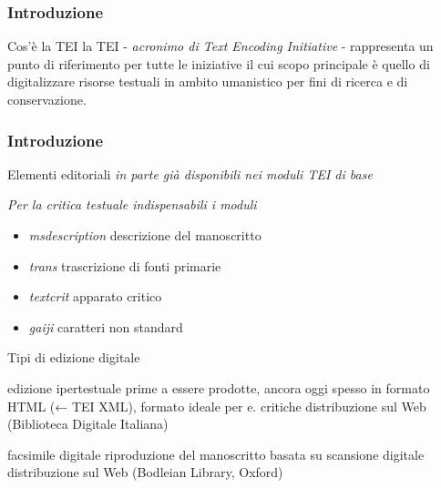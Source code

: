\begin{frame}
    \frametitle{Introduzione}
    \addtocounter{nframe}{1}
    

    \begin{block}{Cos'è la TEI}
        la TEI - \textit{acronimo di Text Encoding Initiative} - rappresenta un punto di riferimento per tutte le iniziative il cui scopo principale è quello di digitalizzare risorse testuali in ambito umanistico per fini di ricerca e di conservazione.
    \end{block}
    
\end{frame}

\begin{frame}
  \frametitle{Introduzione}
  \addtocounter{nframe}{1}
  

  \begin{block}{Elementi editoriali}
      \emph{in parte già disponibili nei moduli TEI di base}
      
      \textit{Per la critica testuale indispensabili i moduli}
      \begin{itemize}
          \item \emph{msdescription} descrizione del manoscritto 
          \item \emph{trans} trascrizione di fonti primarie 
          \item \emph{textcrit} apparato critico
          \item \emph{gaiji} caratteri non standard
      \end{itemize}
  \end{block}
  
\end{frame}

Tipi di edizione digitale

edizione ipertestuale
prime a essere prodotte, ancora oggi spesso in formato HTML (← TEI XML), formato ideale per e. critiche
distribuzione sul Web (Biblioteca Digitale Italiana) 

facsimile digitale
riproduzione del manoscritto basata su scansione digitale
distribuzione sul Web (Bodleian Library, Oxford)


